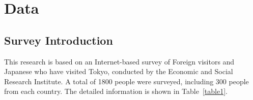 

\chapter{Data}

\section{Survey Introduction}
This research is based on an Internet-based survey of Foreign visitors and Japanese who have visited Tokyo, conducted by the Economic and Social Research Institute. A total of 1800 people were surveyed, including 300 people from each country. The detailed information is shown in Table~\ref{table1}. 

